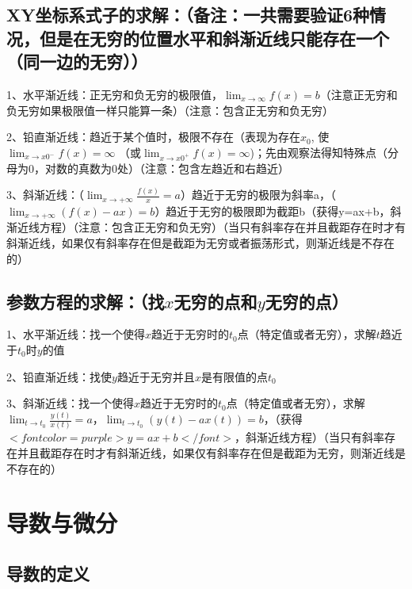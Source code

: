 \subsection{XY坐标系式子的求解：（备注：一共需要验证6种情况，但是在无穷的位置水平和斜渐近线只能存在一个（同一边的无穷））}

1、水平渐近线：正无穷和负无穷的极限值，$ \lim _{x \rightarrow \infty} f(x)=b $（注意正无穷和负无穷如果极限值一样只能算一条）（注意：包含正无穷和负无穷）

2、铅直渐近线：趋近于某个值时，极限不存在（表现为存在$ x_{0} $,  使$ \lim_{x \rightarrow x{0}^{-}} f(x)=\infty $ （或$ \lim_{x \rightarrow x{0}^{+}} f(x)=\infty $)；先由观察法得知特殊点（分母为0，对数的真数为0处）（注意：包含左趋近和右趋近）

3、斜渐近线：（$ \lim _{x \rightarrow+\infty} \frac{f(x)}{x}=a $）趋近于无穷的极限为斜率a，（$ \lim _{x \rightarrow+\infty} ({f(x)}-{ax})=b $）趋近于无穷的极限即为截距b（获得y=ax+b，斜渐近线方程）（注意：包含正无穷和负无穷）（当只有斜率存在并且截距存在时才有斜渐近线，如果仅有斜率存在但是截距为无穷或者振荡形式，则渐近线是不存在的）



\subsection{参数方程的求解：（找$ x $无穷的点和$ y $无穷的点）}

1、水平渐近线：找一个使得$ x $趋近于无穷时的$ t_0 $点（特定值或者无穷），求解$ t $趋近于$ t_0 $时$ y $的值

2、铅直渐近线：找使$ y $趋近于无穷并且$ x $是有限值的点$ t_0 $

3、斜渐近线：找一个使得$ x $趋近于无穷时的$ t_0 $点（特定值或者无穷），求解$ \lim _{t \rightarrow t_0} \frac{y(t)}{x(t)}=a $，$ \lim _{t \rightarrow t_0} ({y(t)}-{ax(t)})=b $，（获得$ <font color=purple>y=ax+b</font> $，斜渐近线方程）（当只有斜率存在并且截距存在时才有斜渐近线，如果仅有斜率存在但是截距为无穷，则渐近线是不存在的）

\section{导数与微分}



\subsection{导数的定义}

